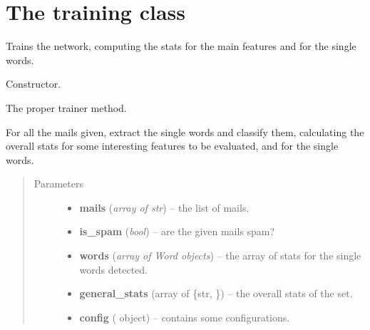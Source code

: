 \documentclass[letterpaper,10pt,english]{sphinxmanual}
\begin{document}
\section{The training class}
\label{index:the-training-class}\label{index:module-trainer}

\begin{fulllineitems}
\label{index:trainer.Trainer}
Trains the network, computing the stats for the main features
and for the single words.

\begin{fulllineitems}
\label{index:trainer.Trainer.__init__}
Constructor.

\end{fulllineitems}


\begin{fulllineitems}
\label{index:trainer.Trainer.train}
The proper trainer method.

For all the mails given, extract the single words and classify them,
calculating the overall stats for some interesting features to be
evaluated, and for the single words.
\begin{quote}\begin{description}
\item[{Parameters}] \leavevmode\begin{itemize}
\item {} 
\textbf{mails} (\emph{array of str}) -- the list of mails.

\item {} 
\textbf{is\_spam} (\emph{bool}) -- are the given mails spam?

\item {} 
\textbf{words} (\emph{array of Word objects}) -- the array of stats for the single words detected.

\item {} 
\textbf{general\_stats} (array of \{str, {\hyperref[index:gen_stat.Stat]{}}\}) -- the overall stats of the set.

\item {} 
\textbf{config} ({\hyperref[index:config.Config]{}} object) -- contains some configurations.


\end{itemize}
\end{description}
\end{quote}
\end{fulllineitems}
\end{fulllineitems}
\end{document}

